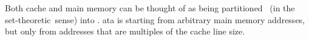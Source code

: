 \begin{comment}
   The term cache line is also used to refer to \alts{identically, appropriately} sized
   blocks in main memory.
   These blocks are fixed:

   Cache lines in main memory are fixed.
   Data blocks that are loaded don't start at arbitrary addresses, but at multiples of the
   cache line size.
\end{comment}
Both cache and main memory can be thought of as being partitioned%
\ (in the set-theoretic\ sense) %
into .  ata is   starting from
arbitrary main memory addresses,
but only from addresses that are multiples of the cache line size.



%

